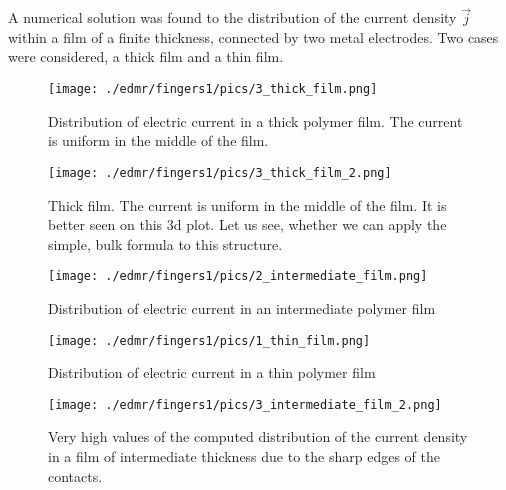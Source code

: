 A numerical solution was found to the distribution of the current density $\vec{j}$ within a film of a finite thickness, connected by two metal electrodes. Two cases were considered, a thick film and a thin film.

\begin{figure} [!ht]
\begin{center}
       \texttt{[image: ./edmr/fingers1/pics/3\_thick\_film.png]}
       \end{center}
\caption{Distribution of electric current in a thick polymer film. The current is uniform in the middle of the film. }
     \label{fig:dits_thick_2d}
\end{figure}

\begin{figure} [!ht]
\begin{center}
       \texttt{[image: ./edmr/fingers1/pics/3\_thick\_film\_2.png]}
       \end{center}
\caption{Thick film. The current is uniform in the middle of the film. It is better seen on this 3d plot. Let us see, whether we can apply the simple, bulk formula to this structure. }
     \label{fig:dits_thick_3d}
\end{figure}


\begin{figure} [!ht]
\begin{center}
       \texttt{[image: ./edmr/fingers1/pics/2\_intermediate\_film.png]}
       \end{center}
\caption{Distribution of electric current in an intermediate polymer film}
     \label{fig:dits_inter}
\end{figure}

\begin{figure} [!ht]
\begin{center}
       \texttt{[image: ./edmr/fingers1/pics/1\_thin\_film.png]}
       \end{center}
\caption{Distribution of electric current in a thin polymer film}
     \label{fig:dits_thin}
\end{figure}

\begin{figure} [!ht]
\begin{center}
       \texttt{[image: ./edmr/fingers1/pics/3\_intermediate\_film\_2.png]}
       \end{center}
\caption{Very high values of the computed distribution of the current density in a film of intermediate thickness due to the sharp edges of the contacts.}
     \label{fig:dits_singular}
\end{figure}


